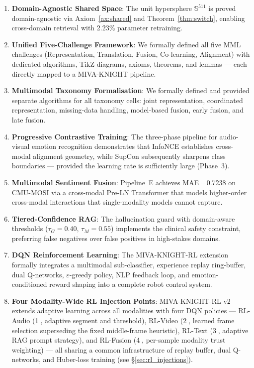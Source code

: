 \documentclass[12pt,a4paper]{article}
\theoremstyle{definition}
\theoremstyle{plain}
\theoremstyle{remark}
\newcommand{\Sph}{\mathbb{S}}
\begin{document}
\begin{enumerate}
  \item \textbf{Domain-Agnostic Shared Space}: The unit hypersphere $\Sph^{511}$ is proved domain-agnostic via Axiom~\ref{ax:shared} and Theorem~\ref{thm:switch}, enabling cross-domain retrieval with 2.23\% parameter retraining.

  \item \textbf{Unified Five-Challenge Framework}: We formally defined all five MML challenges (Representation, Translation, Fusion, Co-learning, Alignment) with dedicated algorithms, TikZ diagrams, axioms, theorems, and lemmas --- each directly mapped to a MIVA-KNIGHT pipeline.

  \item \textbf{Multimodal Taxonomy Formalisation}: We formally defined and provided separate algorithms for all taxonomy cells: joint representation, coordinated representation, missing-data handling, model-based fusion, early fusion, and late fusion.

  \item \textbf{Progressive Contrastive Training}: The three-phase pipeline for audio-visual emotion recognition demonstrates that InfoNCE establishes cross-modal alignment geometry, while SupCon subsequently sharpens class boundaries --- provided the learning rate is sufficiently large (Phase~3).

  \item \textbf{Multimodal Sentiment Fusion}: Pipeline~E achieves MAE\,=\,0.7238 on CMU-MOSI via a cross-modal Pre-LN Transformer that models higher-order cross-modal interactions that single-modality models cannot capture.

  \item \textbf{Tiered-Confidence RAG}: The hallucination guard with domain-aware thresholds ($\tau_G = 0.40$, $\tau_M = 0.55$) implements the clinical safety constraint, preferring false negatives over false positives in high-stakes domains.

  \item \textbf{DQN Reinforcement Learning}: The MIVA-KNIGHT-RL extension formally integrates a multimodal sub-classifier, experience replay ring-buffer, dual Q-networks, $\varepsilon$-greedy policy, NLP feedback loop, and emotion-conditioned reward shaping into a complete robot control system.

  \item \textbf{Four Modality-Wide RL Injection Points}: MIVA-KNIGHT-RL v2 extends adaptive learning across all modalities with four DQN policies --- RL-Audio (\textcircled{1}, adaptive segment and threshold), RL-Video (\textcircled{2}, learned frame selection superseding the fixed middle-frame heuristic), RL-Text (\textcircled{3}, adaptive RAG prompt strategy), and RL-Fusion (\textcircled{4}, per-sample modality trust weighting) --- all sharing a common infrastructure of replay buffer, dual Q-networks, and Huber-loss training (see \S\ref{sec:rl_injections}).


\end{enumerate}
\end{document}
